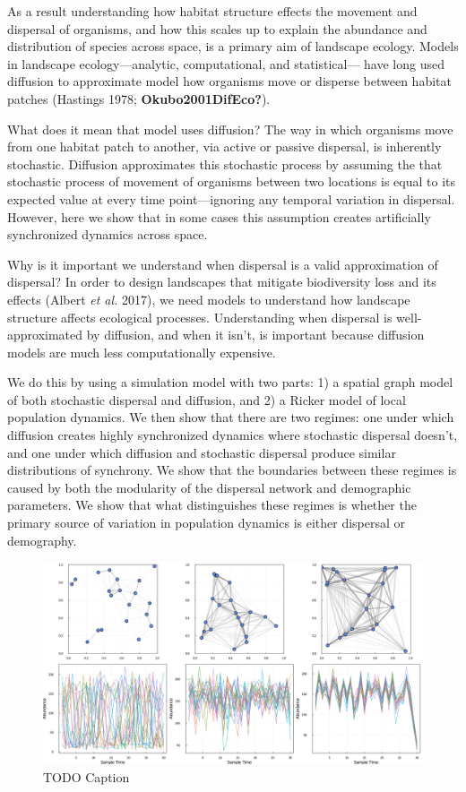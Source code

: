\documentclass[10pt,oneside]{article}
\makeatletter
\def\maxwidth{\ifdim\Gin@nat@width>\linewidth\linewidth
\else\Gin@nat@width\fi}
\let\Oldincludegraphics\includegraphics
\renewcommand{\includegraphics}[1]{\Oldincludegraphics[width=\maxwidth]{#1}}
\makeatother
\begin{document}
As a result understanding how habitat structure effects the movement and
dispersal of organisms, and how this scales up to explain the abundance
and distribution of species across space, is a primary aim of landscape
ecology. Models in landscape ecology---analytic, computational, and
statistical--- have long used diffusion to approximate model how
organisms move or disperse between habitat patches (Hastings 1978;
\textbf{Okubo2001DifEco?}).

What does it mean that model uses diffusion? The way in which organisms
move from one habitat patch to another, via active or passive dispersal,
is inherently stochastic. Diffusion approximates this stochastic process
by assuming the that stochastic process of movement of organisms between
two locations is equal to its expected value at every time
point---ignoring any temporal variation in dispersal. However, here we
show that in some cases this assumption creates artificially
synchronized dynamics across space.

Why is it important we understand when dispersal is a valid
approximation of dispersal? In order to design landscapes that mitigate
biodiversity loss and its effects (Albert \emph{et al.} 2017), we need
models to understand how landscape structure affects ecological
processes. Understanding when dispersal is well-approximated by
diffusion, and when it isn't, is important because diffusion models are
much less computationally expensive.

We do this by using a simulation model with two parts: 1) a spatial
graph model of both stochastic dispersal and diffusion, and 2) a Ricker
model of local population dynamics. We then show that there are two
regimes: one under which diffusion creates highly synchronized dynamics
where stochastic dispersal doesn't, and one under which diffusion and
stochastic dispersal produce similar distributions of synchrony. We show
that the boundaries between these regimes is caused by both the
modularity of the dispersal network and demographic parameters. We show
that what distinguishes these regimes is whether the primary source of
variation in population dynamics is either dispersal or demography.

\begin{figure}
\hypertarget{fig:example}{%
\centering
\includegraphics{./figures/synchrony_example.png}
\caption{TODO Caption}\label{fig:example}
}
\end{figure}
\end{document}
